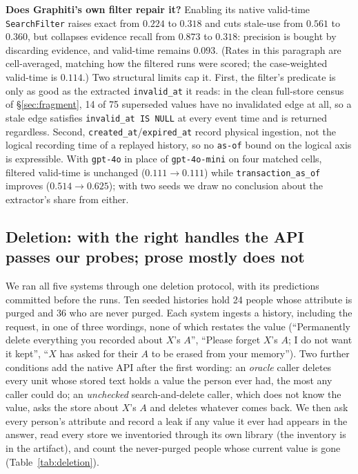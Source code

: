 \documentclass[conference]{IEEEtran}
\begin{document}
\textbf{Does Graphiti's own filter repair it?} Enabling its native valid-time
\texttt{SearchFilter} raises exact from $0.224$ to $0.318$ and cuts stale-use
from $0.561$ to $0.360$, but collapses evidence recall from $0.873$ to $0.318$:
precision is bought by discarding evidence, and valid-time remains $0.093$.
(Rates in this paragraph are cell-averaged, matching how the filtered runs were
scored; the case-weighted valid-time is $0.114$.)
Two structural limits cap it. First, the filter's predicate is only as good as
the extracted \texttt{invalid\_at} it reads: in the clean full-store census of
\S\ref{sec:fragment}, 14 of 75 superseded values have no invalidated edge at
all, so a stale edge satisfies \texttt{invalid\_at IS NULL} at every event time
and is returned regardless. Second, \texttt{created\_at}/\texttt{expired\_at}
record physical ingestion, not the logical recording time of a replayed
history, so no \texttt{as-of} bound on the logical axis is expressible. With
\texttt{gpt-4o} in place of \texttt{gpt-4o-mini} on four matched cells, filtered
valid-time is unchanged ($0.111 \to 0.111$) while \texttt{transaction\_as\_of}
improves ($0.514 \to 0.625$); with two seeds we draw no conclusion about the
extractor's share from either.

\subsection{Deletion: with the right handles the API passes our probes; prose mostly does not}
\label{sec:deletion}

We ran all five systems through one deletion protocol, with its predictions
committed before the runs. Ten seeded histories hold 24 people whose attribute
is purged and 36 who are never purged. Each system ingests a history, including
the request, in one of three wordings, none of which restates the value
(``Permanently delete everything you recorded about $X$'s $A$'', ``Please forget
$X$'s $A$; I do not want it kept'', ``$X$ has asked for their $A$ to be erased
from your memory''). Two further conditions add the native API after the first
wording: an \emph{oracle} caller deletes every unit whose stored text holds a
value the person ever had, the most any caller could do; an \emph{unchecked}
search-and-delete caller, which does not know the value, asks the store about
$X$'s $A$ and deletes whatever comes back. We then ask every person's attribute and record a leak if
any value it ever had appears in the answer, read every store we inventoried
through its own library (the inventory is in the artifact), and count the never-purged people whose current value is gone
(Table~\ref{tab:deletion}).
\end{document}
